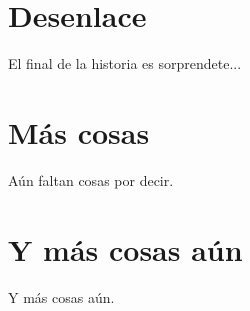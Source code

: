 \documentclass[a4paper,openright,12pt]{book}
\begin{document}
\chapter{Desenlace}\label{cap.desenlace}
El final de la historia es sorprendete...

\appendix
\chapter{Más cosas}\label{aped.A}
Aún faltan cosas por decir.

\chapter{Y más cosas aún}\label{aped.B}
Y más cosas aún.

\cleardoublepage
{}
\end{document}
